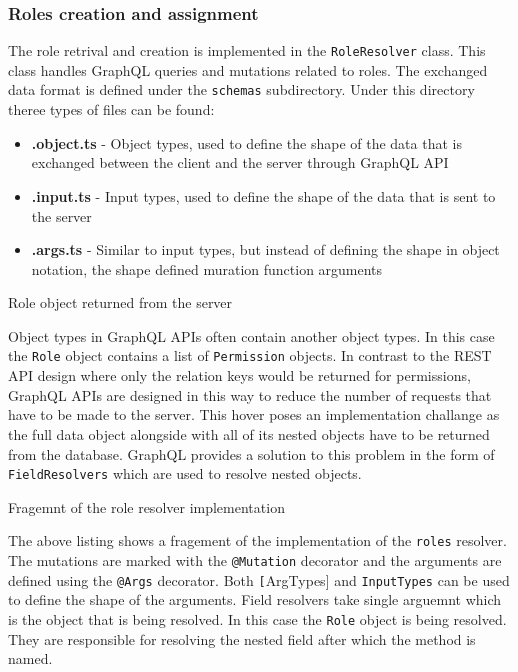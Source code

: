 \documentclass[../main.tex]{subfiles}
\begin{document}
\subsubsection{Roles creation and assignment}

The role retrival and creation is implemented in the \texttt{RoleResolver} class. This class handles GraphQL queries and mutations related to roles.
The exchanged data format is defined under the \texttt{schemas} subdirectory. Under this directory theree types of files can be found:

\begin{itemize}
  \item \textbf{.object.ts} - Object types, used to define the shape of the data that is exchanged between the client and the server through GraphQL API
  \item \textbf{.input.ts} - Input types, used to define the shape of the data that is sent to the server
  \item \textbf{.args.ts} - Similar to input types, but instead of defining the shape in object notation, the shape defined muration function arguments
\end{itemize}

\begin{listing}[H]
  \caption{Role object returned from the server}
\end{listing}

Object types in GraphQL APIs often contain another object types. In this case the \texttt{Role} object contains a list of \texttt{Permission} objects.
In contrast to the REST API design where only the relation keys would be returned for permissions, GraphQL APIs are designed in this way to reduce the number of requests that have to be made to the server.
This hover poses an implementation challange as the full data object alongside with all of its nested objects have to be returned from the database.
GraphQL provides a solution to this problem in the form of \texttt{FieldResolvers} which are used to resolve nested objects.

\begin{listing}[H]
  \caption{Fragemnt of the role resolver implementation}
\end{listing}

The above listing shows a fragement of the implementation of the \texttt{roles} resolver.
The mutations are marked with the \texttt{@Mutation} decorator and the arguments are defined using the \texttt{@Args} decorator.
Both \texttt[ArgTypes] and \texttt{InputTypes} can be used to define the shape of the arguments.
Field resolvers take single arguemnt which is the object that is being resolved. In this case the \texttt{Role} object is being resolved.
They are responsible for resolving the nested field after which the method is named.
\end{document}
